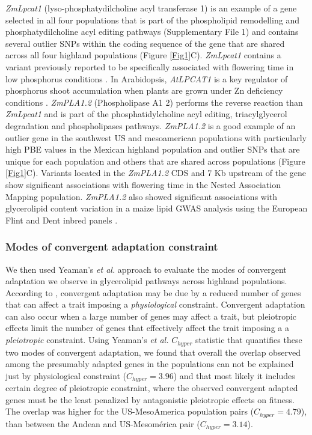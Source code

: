 \documentclass[9pt,twocolumn,twoside]{BioRxiv}
\begin{document}
\textit{ZmLpcat1} (lyso-phosphatydilcholine acyl transferase 1) is an example of a gene selected in all four populations that is part of the phospholipid remodelling and phosphatydilcholine acyl editing pathways (Supplementary File 1) and contains several outlier SNPs within the coding sequence of the gene that are shared across all four highland populations (Figure \ref{Fig1}C). \textit{ZmLpcat1} contains a variant previously reported to be specifically associated with flowering time in low phosphorus conditions \cite{xu2018a}. 
In Arabidopsis, \textit{AtLPCAT1} is a key regulator of phosphorus shoot accumulation when plants are grown under Zn deficiency conditions \cite{Kisko2018-zm}.
\textit{ZmPLA1.2} (Phospholipase A1 2) performs the reverse reaction than \textit{ZmLpcat1} and is part of the phosphatidylcholine acyl editing, triacylglycerol degradation and phospholipases pathways. 
\textit{ZmPLA1.2} is a good example of an outlier gene in the southwest US and mesoamerican populations with particularly high PBE values in the Mexican highland population and outlier SNPs that are unique for each population and others that are shared across populations (Figure \ref{Fig1}C). 
Variants located in the \textit{ZmPLA1.2} CDS \cite{Chen2012-gg} and 7 Kb upstream  of the gene \cite{Hung2012-ms} show significant associations with flowering time in the Nested Association Mapping population. \textit{ZmPLA1.2} also showed significant associations with glycerolipid content variation in a maize lipid GWAS analysis using the European Flint and Dent inbred panels \cite{Riedelsheimer2013-bd}.

\subsubsection{Modes of convergent adaptation constraint} 
We then used Yeaman's \textit{et al.} \cite{yeaman2018} approach to evaluate the modes of convergent adaptation we observe in glycerolipid pathways across highland populations. 
According to \cite{yeaman2018}, convergent adaptation may be due by a reduced number of genes that can affect a trait imposing a \textit{physiological} constraint. 
Convergent adaptation can also occur when a large number of genes may affect a trait, but pleiotropic effects limit the number of genes that effectively affect the trait imposing a a \textit{pleiotropic} constraint. 
Using Yeaman's \textit{et al.} $C_{hyper}$ statistic \cite{yeaman2018} that quantifies these two modes of convergent adaptation, we found that overall the overlap observed among the presumably adapted genes in the populations can not be explained just by physiological constraint ($C_{hyper} = 3.96$) and that most likely it includes certain degree of pleiotropic constraint, where the observed convergent adapted genes must be the least penalized by antagonistic pleiotropic effects on fitness.
The overlap was higher for the US-MesoAmerica population pairs ($C_{hyper} = 4.79$), than between the Andean and US-Mesomérica pair ($C_{hyper} = 3.14$).
\end{document}
